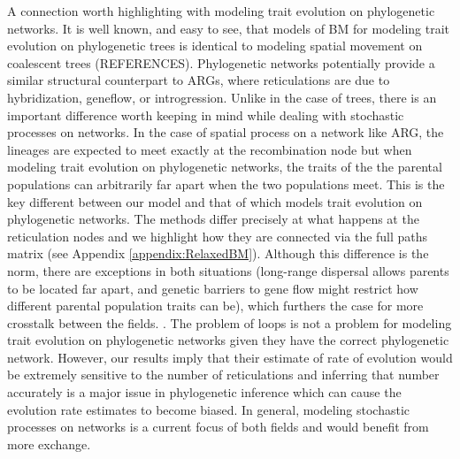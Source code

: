 
A connection worth highlighting with modeling trait evolution on phylogenetic networks. It is well known, and easy to see, that models of BM for modeling trait evolution on phylogenetic trees is identical to modeling spatial movement on coalescent trees (REFERENCES). Phylogenetic networks potentially provide a similar structural counterpart to ARGs, where reticulations are due to hybridization, geneflow, or introgression. Unlike in the case of trees, there is an important difference worth keeping in mind while dealing with stochastic processes on networks. In the case of spatial process on a network like ARG, the lineages are expected to meet exactly at the recombination node but when modeling trait evolution on phylogenetic networks, the traits of the the parental populations can arbitrarily far apart when the two populations meet. This is the key different between our model and that of \cite{Bastide2018} which models trait evolution on phylogenetic networks. The methods differ precisely at what happens at the reticulation nodes and we highlight how they are connected via the full paths matrix (see Appendix \ref{appendix:RelaxedBM}). Although this difference is the norm, there are exceptions in both situations (long-range dispersal allows parents to be located far apart, and genetic barriers to gene flow might restrict how different parental population traits can be), which furthers the case for more crosstalk between the fields. . The problem of loops is not a problem for modeling trait evolution on phylogenetic networks given they have the correct phylogenetic network. However, our results imply that their estimate of rate of evolution would be extremely sensitive to the number of reticulations and inferring that number accurately is a major issue in phylogenetic inference which can cause the evolution rate estimates to become biased. In general, modeling stochastic processes on networks is a current focus of both fields and would benefit from more exchange. 

